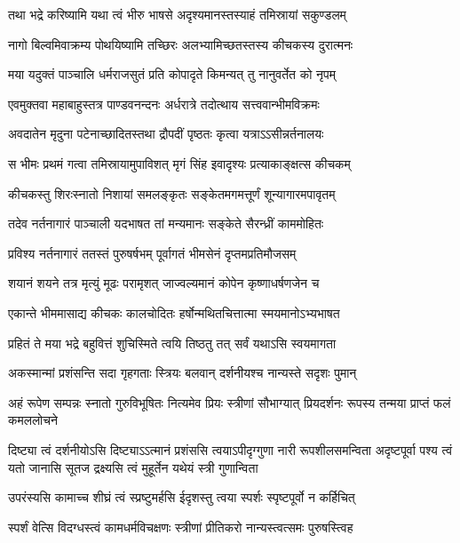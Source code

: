 \twolineshloka
{तथा भद्रे करिष्यामि यथा त्वं भीरु भाषसे}
{अदृश्यमानस्तस्याहं तमिस्रायां सकुण्डलम्}


\twolineshloka
{नागो बिल्वमिवाक्रम्य पोथयिष्यामि तच्छिरः}
{अलभ्यामिच्छतस्तस्य कीचकस्य दुरात्मनः}


\twolineshloka
{मया यदुक्तं पाञ्चालि धर्मराजसुतं प्रति}
{कोपादृते किमन्यत् तु नानुवर्तेत को नृपम्}



\twolineshloka
{एवमुक्तवा महाबाहुस्तत्र पाण्डवनन्दनः}
{अर्धरात्रे तदोत्थाय सत्त्ववान्भीमविक्रमः}


\twolineshloka
{अवदातेन मृदुना पटेनाच्छादितस्तथा}
{द्रौपदीं पृष्ठतः कृत्वा यत्राऽऽसीन्नर्तनालयः}


\twolineshloka
{स भीमः प्रथमं गत्वा तमिस्रायामुपाविशत्}
{मृगं सिंह इवादृश्यः प्रत्याकाङ्क्षत्स कीचकम्}


\twolineshloka
{कीचकस्तु शिरःस्नातो निशायां समलङ्कृतः}
{सङ्केतमगमत्तूर्णं शून्यागारमपावृतम्}


\twolineshloka
{तदेव नर्तनागारं पाञ्चाली यदभाषत}
{तां मन्यमानः सङ्केते सैरन्ध्रीं काममोहितः}


\twolineshloka
{प्रविश्य नर्तनागारं ततस्तं पुरुषर्षभम्}
{पूर्वागतं भीमसेनं दृप्तमप्रतिमौजसम्}


\twolineshloka
{शयानं शयने तत्र मृत्युं मूढः परामृशत्}
{जाज्वल्यमानं कोपेन कृष्णाधर्षणजेन च}


\twolineshloka
{एकान्ते भीममासाद्य कीचकः कालचोदितः}
{हर्षोन्मथितचित्तात्मा स्मयमानोऽभ्यभाषत}


\twolineshloka
{प्रहितं ते मया भद्रे बहुवित्तं शुचिस्मिते}
{त्वयि तिष्ठतु तत् सर्वं यथाऽसि स्वयमागता}


\twolineshloka
{अकस्मान्मां प्रशंसन्ति सदा गृहगताः स्त्रियः}
{बलवान् दर्शनीयश्च नान्यस्ते सदृशः पुमान्}


\threelineshloka
{अहं रूपेण सम्पन्नः स्नातो गुरुविभूषितः}
{नित्यमेव प्रियः स्त्रीणां सौभाग्यात् प्रियदर्शनः}
{रूपस्य तन्मया प्राप्तं फलं कमललोचने}




\onelineshloka
{दिष्ट्या त्वं दर्शनीयोऽसि दिष्ट्याऽऽत्मानं प्रशंससि}
\threelineshloka
{त्वयाऽपीदृग्गुणा नारी रूपशीलसमन्विता}
{अदृष्टपूर्वा पश्य त्वं यतो जानासि सूतज}
{द्रक्ष्यसि त्वं मुहूर्तेन यथेयं स्त्री गुणान्विता}


\twolineshloka
{उपरंस्यसि कामाच्च शीघ्रं त्वं स्प्रष्टुमर्हसि}
{ईदृशस्तु त्वया स्पर्शः स्पृष्टपूर्वो न कर्हिचित्}


\twolineshloka
{स्पर्शं वेत्सि विदग्धस्त्वं कामधर्मविचक्षणः}
{स्त्रीणां प्रीतिकरो नान्यस्त्वत्समः पुरुषस्त्विह}


